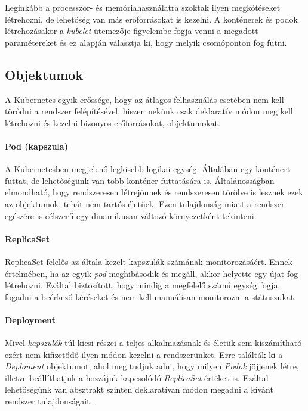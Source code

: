 Leginkább a processzor- és memóriahasználatra szoktak ilyen megkötéseket létrehozni, de lehetőség
van más erőforrásokat is kezelni.
A konténerek és podok létrehozásakor a \textit{kubelet} ütemezője figyelembe fogja venni a megadott
paramétereket és ez alapján választja ki, hogy melyik csomóponton fog futni. 

\subsection{Objektumok}
A Kubernetes egyik erőssége, hogy az átlagos felhasználás esetében nem kell törődni a rendszer felépítésével, hiszen nekünk csak deklaratív módon meg kell létrehozni és kezelni bizonyos erőforrásokat, objektumokat.
  
\paragraph{Pod (kapszula)}
A Kubernetesben megjelenő legkisebb logikai egység.
Általában egy konténert futtat, de lehetőségünk van több konténer futtatására is. Általánosságban elmondható, hogy rendszeresen létrejönnek és rendszeresen törölve is lesznek ezek az objektumok, tehát nem tartós életűek.
Ezen tulajdonság miatt a rendszer egészére is célszerű egy dinamikusan változó környezetként tekinteni.

\paragraph{ReplicaSet} 
ReplicaSet felelős az általa kezelt kapszulák számának monitorozásáért. Ennek értelmében, ha az egyik \textit{pod} meghibásodik és megáll, akkor helyette egy újat fog létrehozni. Ezáltal biztosított, hogy mindig a megfelelő számú egység fogja fogadni a beérkező kéréseket és nem kell manuálisan monitorozni a státuszukat.

\paragraph{Deployment}
Mivel \textit{kapszulák} túl kicsi részei a teljes alkalmazásnak és életük sem kiszámítható ezért nem kifizetődő ilyen módon kezelni a rendszerünket. Erre találták ki a \textit{Deploment} objektumot, ahol meg tudjuk adni, hogy milyen \textit{Podok} jöjjenek létre, illetve beállíthatjuk a hozzájuk kapcsolódó \textit{ReplicaSet} értéket is. Ezáltal lehetőségünk van absztrakt szinten deklaratívan módon megadni a kívánt rendszer tulajdonságait.

